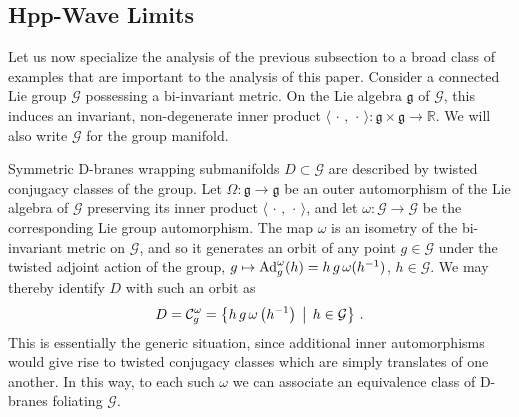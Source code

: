 \documentclass[11pt,a4paper]{article}
\newcommand{\real}{{\mathbb R}} %
\newcommand{\beq}{\begin{eqnarray}}
\newcommand{\eeq}{\end{eqnarray}}
\begin{document}
\subsection{Hpp-Wave Limits\label{PGLNW}}

Let us now specialize the analysis of the previous subsection to a broad
class of examples that are important to the analysis of this
paper. Consider a connected Lie group $\mathcal{G}$ possessing a bi-invariant
metric. On the Lie algebra $\mathfrak g$ of $\mathcal{G}$, this induces an
invariant, non-degenerate inner product
$\langle\,\cdot\,,\,\cdot\,\rangle:\mathfrak{g}\times\mathfrak{g}\to\real$.
We will also write $\mathcal{G}$ for the group manifold.

Symmetric D-branes wrapping submanifolds $D\subset \mathcal{G}$ are
described by twisted conjugacy classes of the group. Let
$\Omega:\mathfrak{g}\to\mathfrak{g}$ be an outer automorphism of the
Lie algebra of $\mathcal{G}$ preserving its inner product
$\langle\,\cdot\,,\,\cdot\,\rangle$, and let $\omega:\mathcal{G}\to
\mathcal{G}$ be the corresponding Lie group automorphism. The map
$\omega$ is an isometry of the bi-invariant metric on $\mathcal G$, and so it
generates an orbit of any point $g\in \mathcal{G}$ under the
twisted adjoint action of the group, $g\mapsto{\rm
  Ad}_g^\omega(h)=h\,g\,\omega(h^{-1})$, $h\in \mathcal{G}$. We may
thereby identify $D$ with such an orbit as
\beq
D={\mathcal C}_g^\omega=\bigl\{h\,g\,\omega\left(h^{-1}\right)\,
\bigm|\,h\in \mathcal{G}\bigr\} \ .
\label{Dtwistconj}\eeq
This is essentially the generic situation, since additional inner
automorphisms would give rise to twisted conjugacy classes which are
simply translates of one another. In this way, to each such $\omega$
we can associate an equivalence class of D-branes foliating $\mathcal{G}$.
\end{document}

